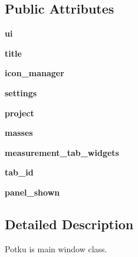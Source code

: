 \subsection*{Public Attributes}
\begin{DoxyCompactItemize}
\item 
\hypertarget{classpotku_1_1Potku_aca7058507a308f42cf48c31081957ec5}{{\bfseries ui}}\label{classpotku_1_1Potku_aca7058507a308f42cf48c31081957ec5}

\item 
\hypertarget{classpotku_1_1Potku_a792d75a421af67fc262b2ce9b73a5ac9}{{\bfseries title}}\label{classpotku_1_1Potku_a792d75a421af67fc262b2ce9b73a5ac9}

\item 
\hypertarget{classpotku_1_1Potku_a09b0f52e39fda656dc8b9af37192722e}{{\bfseries icon\-\_\-manager}}\label{classpotku_1_1Potku_a09b0f52e39fda656dc8b9af37192722e}

\item 
\hypertarget{classpotku_1_1Potku_a60425f7e1b40142bbefdd236369a8ddf}{{\bfseries settings}}\label{classpotku_1_1Potku_a60425f7e1b40142bbefdd236369a8ddf}

\item 
\hypertarget{classpotku_1_1Potku_a57c634eee881a8f40626072af58eb127}{{\bfseries project}}\label{classpotku_1_1Potku_a57c634eee881a8f40626072af58eb127}

\item 
\hypertarget{classpotku_1_1Potku_a2f1a58d78f83e6d687224903d2cfdf49}{{\bfseries masses}}\label{classpotku_1_1Potku_a2f1a58d78f83e6d687224903d2cfdf49}

\item 
\hypertarget{classpotku_1_1Potku_a910e6a13bcad092b7b3d032e201783da}{{\bfseries measurement\-\_\-tab\-\_\-widgets}}\label{classpotku_1_1Potku_a910e6a13bcad092b7b3d032e201783da}

\item 
\hypertarget{classpotku_1_1Potku_a41041603732ae1a8d9b9c28728c7541b}{{\bfseries tab\-\_\-id}}\label{classpotku_1_1Potku_a41041603732ae1a8d9b9c28728c7541b}

\item 
\hypertarget{classpotku_1_1Potku_a448ce351d466c6cd43a9462e14ca9f6a}{{\bfseries panel\-\_\-shown}}\label{classpotku_1_1Potku_a448ce351d466c6cd43a9462e14ca9f6a}

\end{DoxyCompactItemize}


\subsection{Detailed Description}
\begin{DoxyVerb}Potku is main window class.
\end{DoxyVerb}
 

